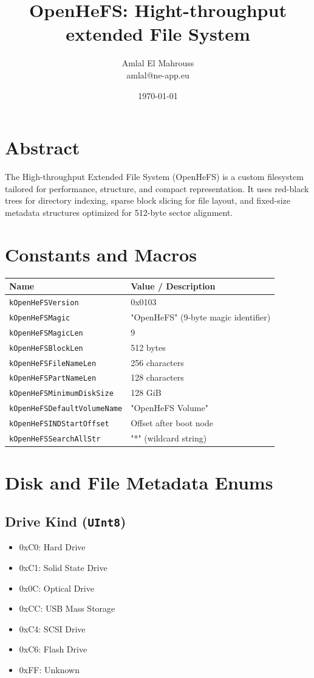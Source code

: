 \documentclass{article}
\title{OpenHeFS: Hight-throughput extended File System}
\author{Amlal El Mahrouss\\amlal@ne-app.eu}
\date{\today}
\begin{document}
\maketitle

\section{Abstract}
The High-throughput Extended File System (OpenHeFS) is a custom filesystem tailored for performance, structure, and compact representation. It uses red-black trees for directory indexing, sparse block slicing for file layout, and fixed-size metadata structures optimized for 512-byte sector alignment.

\section{Constants and Macros}
\begin{longtable}{|l|l|}
\hline
\textbf{Name} & \textbf{Value / Description} \\
\hline
\texttt{kOpenHeFSVersion} & 0x0103 \\
\texttt{kOpenHeFSMagic} & "OpenHeFS" (9-byte magic identifier) \\
\texttt{kOpenHeFSMagicLen} & 9 \\
\texttt{kOpenHeFSBlockLen} & 512 bytes \\
\texttt{kOpenHeFSFileNameLen} & 256 characters \\
\texttt{kOpenHeFSPartNameLen} & 128 characters \\
\texttt{kOpenHeFSMinimumDiskSize} & 128 GiB \\
\texttt{kOpenHeFSDefaultVolumeName} & "OpenHeFS Volume" \\
\texttt{kOpenHeFSINDStartOffset} & Offset after boot node \\
\texttt{kOpenHeFSSearchAllStr} & "*" (wildcard string) \\
\hline
\end{longtable}

\section{Disk and File Metadata Enums}\label{sec:disk-and-file-metadata-enums}

\subsection{Drive Kind (\texttt{UInt8})}\label{subsec:drive-kind-(texttt{uint8})}
\begin{itemize}
\item 0xC0: Hard Drive
\item 0xC1: Solid State Drive
\item 0x0C: Optical Drive
\item 0xCC: USB Mass Storage
\item 0xC4: SCSI Drive
\item 0xC6: Flash Drive
\item 0xFF: Unknown
\end{itemize}
\end{document}
